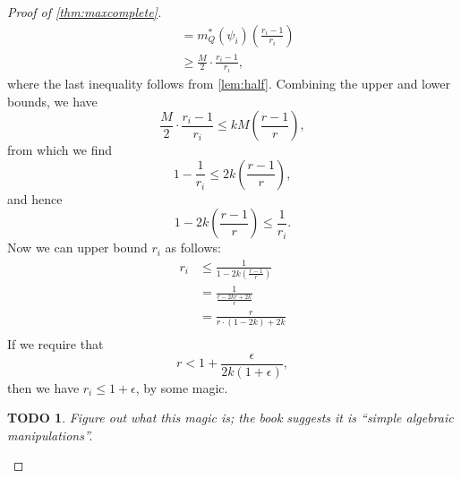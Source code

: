 \documentclass[]{article}
\theoremstyle{plain}
\newtheorem{todo}{TODO}
\theoremstyle{definition}
\begin{document}
\begin{proof}[Proof of \autoref{thm:maxcomplete}]
\begin{align*}
    & = m_Q^*(\psi_i) \left(\frac{r_i - 1}{r_i}\right) \\
    & \geq \frac{M}{2} \cdot \frac{r_i - 1}{r_i},
  \end{align*}
  where the last inequality follows from \autoref{lem:half}.
  Combining the upper and lower bounds, we have
  \begin{equation*}
    \frac{M}{2} \cdot \frac{r_i - 1}{r_i} \leq kM \left(\frac{r - 1}{r}\right),
  \end{equation*}
  from which we find
  \begin{equation*}
    1 - \frac{1}{r_i} \leq 2k\left(\frac{r - 1}{r}\right),
  \end{equation*}
  and hence
  \begin{equation*}
    1 - 2k\left(\frac{r - 1}{r}\right) \leq \frac{1}{r_i}.
  \end{equation*}
  Now we can upper bound $r_i$ as follows:
  \begin{align*}
    r_i & \leq \frac{1}{1 - 2k\left(\frac{r - 1}{r}\right)} \\
    & = \frac{1}{\frac{r - 2kr + 2k}{r}} \\
    & = \frac{r}{r \cdot (1 - 2k) + 2k} \\
  \end{align*}
  If we require that
  \begin{equation*}
    r < 1 + \frac{\epsilon}{2k(1 + \epsilon)},
  \end{equation*}
  then we have $r_i \leq 1 + \epsilon$, by some magic.
  \begin{todo}
    Figure out what this magic is; the book suggests it is ``simple algebraic manipulations''.
  \end{todo}


\end{proof}
\end{document}
